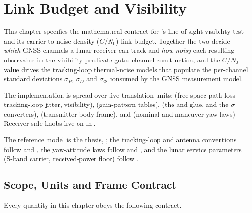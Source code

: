 \chapter{Link Budget and Visibility}
\label{chap:link-budget}

This chapter specifies the mathematical contract for \lupnt{}'s line-of-sight
visibility test and its carrier-to-noise-density ($C/N_0$) link budget.
Together the two decide \emph{which} GNSS channels a lunar receiver can track
and \emph{how noisy} each resulting observable is: the visibility predicate
gates channel construction, and the $C/N_0$ value drives the tracking-loop
thermal-noise models that populate the per-channel standard deviations
$\sigma_P$, $\sigma_D$ and $\sigma_\Phi$ consumed by the GNSS measurement
model.

The implementation is spread over five translation units:
 (free-space path loss,
tracking-loop jitter, visibility),
 (gain-pattern tables),
 (the  and
 glue, and the $\sigma$ converters),
 (transmitter body frame), and
 (nominal and maneuver yaw
laws).  Receiver-side knobs live on  in
.

The reference model is the thesis, \citep[Ch.~6.4.3, Ch.~3.3]{iiyama2026thesis};
the tracking-loop and antenna conventions follow \citet{kaplan2017} and
\citet{misra2011gnss}, the yaw-attitude laws follow \citet{kouba2009yaw} and
\citet{cheng2025yaw}, and the lunar service parameters (S-band carrier,
received-power floor) follow \citep{lunanet2022}.

\section{Scope, Units and Frame Contract}
\label{sec:lb-scope}

Every quantity in this chapter obeys the following contract.


